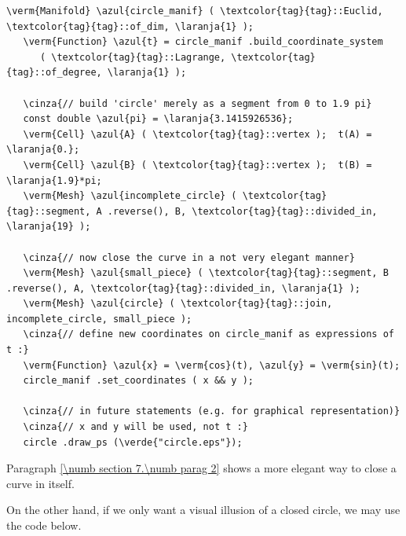 \begin{Verbatim}[commandchars=\\\{\},formatcom=\small\tt,frame=single,
   label=parag-\ref{\numb section 2.\numb parag 15}.cpp,rulecolor=\color{coment},
   baselinestretch=0.94,framesep=2mm]
   \verm{Manifold} \azul{circle_manif} ( \textcolor{tag}{tag}::Euclid, \textcolor{tag}{tag}::of_dim, \laranja{1} );
   \verm{Function} \azul{t} = circle_manif .build_coordinate_system
      ( \textcolor{tag}{tag}::Lagrange, \textcolor{tag}{tag}::of_degree, \laranja{1} );

   \cinza{// build 'circle' merely as a segment from 0 to 1.9 pi}
   const double \azul{pi} = \laranja{3.1415926536};
   \verm{Cell} \azul{A} ( \textcolor{tag}{tag}::vertex );  t(A) =  \laranja{0.};
   \verm{Cell} \azul{B} ( \textcolor{tag}{tag}::vertex );  t(B) =  \laranja{1.9}*pi;
   \verm{Mesh} \azul{incomplete_circle} ( \textcolor{tag}{tag}::segment, A .reverse(), B, \textcolor{tag}{tag}::divided_in, \laranja{19} );

   \cinza{// now close the curve in a not very elegant manner}
   \verm{Mesh} \azul{small_piece} ( \textcolor{tag}{tag}::segment, B .reverse(), A, \textcolor{tag}{tag}::divided_in, \laranja{1} );
   \verm{Mesh} \azul{circle} ( \textcolor{tag}{tag}::join, incomplete_circle, small_piece );
   \cinza{// define new coordinates on circle_manif as expressions of t :}
   \verm{Function} \azul{x} = \verm{cos}(t), \azul{y} = \verm{sin}(t);
   circle_manif .set_coordinates ( x && y );

   \cinza{// in future statements (e.g. for graphical representation)}
   \cinza{// x and y will be used, not t :}
   circle .draw_ps (\verde{"circle.eps"});
\end{Verbatim}


Paragraph \ref{\numb section 7.\numb parag 2} shows a more elegant way to close a curve in itself.

On the other hand, if we only want a visual illusion of a closed circle, we may use the code below.

